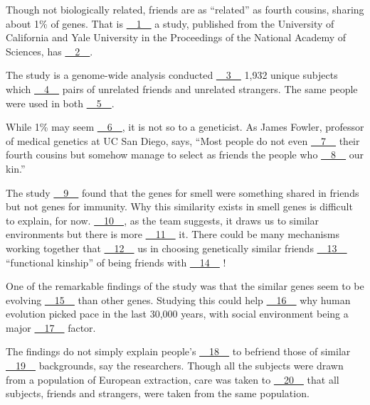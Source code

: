 Though not biologically related, friends are as ``related'' as fourth cousins, sharing about 1\% of genes. That is \uline{~~1~~} a study, published from the University  of California and Yale University in the Proceedings of the National Academy of Sciences, has \uline{~~2~~}.


The study is a genome-wide analysis conducted \uline{~~3~~} 1,932 unique subjects which \uline{~~4~~} pairs of unrelated friends and unrelated strangers. The same people were used in both \uline{~~5~~}.


While 1\% may seem \uline{~~6~~}, it is not so to a geneticist. As James Fowler, professor of medical genetics at UC San Diego, says, ``Most people do not even \uline{~~7~~} their fourth cousins but somehow manage to select as friends the people who \uline{~~8~~} our kin.''


The study \uline{~~9~~} found that the genes for smell were something shared in friends but not genes for immunity. Why this similarity exists in smell genes is difficult to explain, for now. \uline{~~10~~}, as the team suggests, it draws us to similar environments but there is more \uline{~~11~~} it. There could be many mechanisms  working together that \uline{~~12~~} us in choosing genetically similar friends \uline{~~13~~} ``functional kinship'' of being friends with \uline{~~14~~} !


One of the remarkable findings of the study was that the similar genes seem  to be evolving \uline{~~15~~} than other genes. Studying this could help \uline{~~16~~} why  human evolution picked pace in the last 30,000 years, with social environment being a major \uline{~~17~~} factor.


The findings do not simply explain people's \uline{~~18~~} to befriend those of  similar \uline{~~19~~} backgrounds, say the researchers. Though all the subjects were  drawn from a population of European extraction, care was taken to \uline{~~20~~} that all subjects, friends and strangers, were taken from the same population.